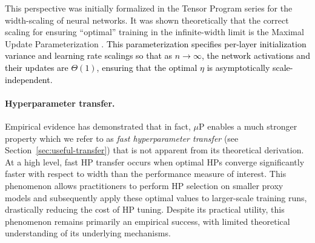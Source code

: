 \documentclass{article} %
\newcommand{\rev}[1]{\textcolor{black}{#1}}
\begin{document}
This perspective was initially formalized in the Tensor Program series \cite{yang2021tensor, yang2022tensor, yang2023tensor} for the width-scaling of neural networks. It was shown theoretically that the correct scaling for ensuring ``optimal'' training in the infinite-width limit is the Maximal Update Parameterization \cite[$\mu$P]{yang2021tensor}. \rev{This parameterization specifies per-layer initialization variance and learning rate scalings so that as $n\to\infty$, the network activations and their updates are $\Theta(1)$, ensuring that the optimal $\eta$ is asymptotically scale-independent.}

\paragraph{Hyperparameter transfer.}
Empirical evidence \cite{yang2022tensor, lingle2024empirical} has demonstrated that in fact,
$\mu$P enables a much stronger property which we refer to as \textit{fast hyperparameter transfer} (see Section~\ref{sec:useful-transfer}) that is not apparent from its theoretical derivation. At a high level, fast HP transfer occurs when optimal HPs converge significantly faster with respect to width than the performance measure of interest. 
This phenomenon allows practitioners to perform HP selection on smaller proxy models and subsequently apply these optimal values to larger-scale training runs, drastically reducing the cost of HP tuning. Despite its practical utility, this phenomenon remains primarily an empirical success, with limited theoretical understanding of its underlying mechanisms. 
\end{document}
